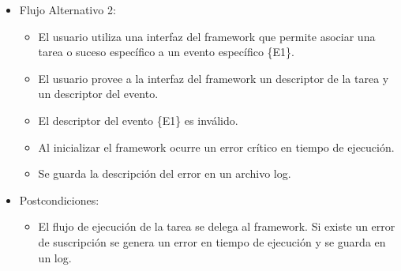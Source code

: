 \begin{itemize}
\begin{itemize}
\begin{itemize}
   		    \end{itemize}
       	\item Flujo Alternativo 2: 
       		\begin{itemize}
       		    \item El usuario utiliza una interfaz del framework que permite
       		    asociar una tarea o suceso específico a un evento específico
       		    \{E1\}.
       		    \item El usuario provee a la interfaz del framework un descriptor
       		    de la tarea y un descriptor del evento.
       		    \item El descriptor del evento \{E1\} es inválido.
       		    \item Al inicializar el framework ocurre un error crítico en tiempo
       		    de ejecución.
       		    \item Se guarda la descripción del error en un archivo log.
   		    \end{itemize}
       	\item Postcondiciones: 
       		\begin{itemize}
       		    \item  El flujo de ejecución de la tarea se delega al
       		    framework. Si existe un error de suscripción se genera un error en
       		    tiempo de ejecución y se guarda en un log.
   		    \end{itemize} 		  
    \end{itemize}

\end{itemize}

